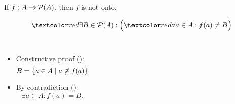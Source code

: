 \begin{frame}{}
  \begin{theorem}
    If $f: A \to \mathcal{P}(A)$, then $f$ is not onto.
  \end{theorem}

  \[
    \red{\exists} B \in \ps{A}: \Big(\red{\forall} a \in A: f(a) \neq B\Big)
  \]

  \pause
  \begin{columns}[t]
      \begin{itemize}
	\item<2-> Constructive proof (\red{$\exists$}):
	  \[
	    B = \{a \in A \mid a \notin f(a)\}
	  \]
	\item<4-> By contradiction (\red{$\forall$}):
	  \[
	    \exists a \in A: f(a) = B.
	  \]
      \end{itemize}
  \end{columns}

  \vspace{-0.30cm}

  \vspace{-0.60cm}
\end{frame}

